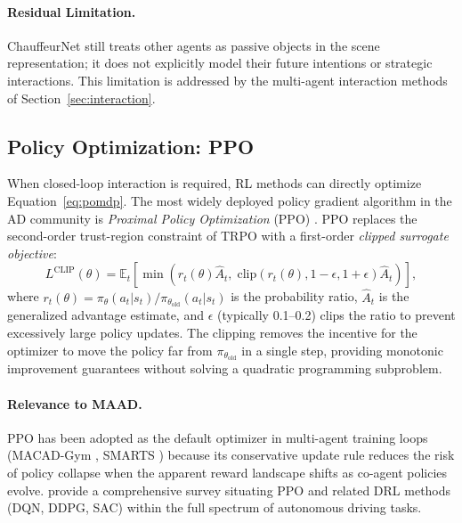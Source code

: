\documentclass[12pt, a4paper]{article}
\begin{document}
\paragraph{Residual Limitation.}
ChauffeurNet still treats other agents as passive objects in the scene
representation; it does not explicitly model their future intentions or strategic
interactions. This limitation is addressed by the multi-agent interaction methods
of Section~\ref{sec:interaction}.

\subsection{Policy Optimization: PPO}
\label{sec:ppo}

When closed-loop interaction is required, RL methods can directly optimize
Equation~\eqref{eq:pomdp}. The most widely deployed policy gradient algorithm in
the AD community is \emph{Proximal Policy Optimization} (PPO)
\citep{schulman2017proximal}. PPO replaces the second-order trust-region
constraint of TRPO with a first-order \emph{clipped surrogate objective}:
\begin{equation}
  L^{\text{CLIP}}(\theta)
  = \mathbb{E}_t \!\left[
      \min\!\left( r_t(\theta)\hat{A}_t,\;
            \text{clip}(r_t(\theta), 1-\epsilon, 1+\epsilon)\hat{A}_t
      \right)
    \right],
  \label{eq:ppo}
\end{equation}
where $r_t(\theta) = \pi_\theta(a_t|s_t)/\pi_{\theta_{\text{old}}}(a_t|s_t)$ is
the probability ratio, $\hat{A}_t$ is the generalized advantage estimate, and
$\epsilon$ (typically 0.1--0.2) clips the ratio to prevent excessively large
policy updates. The clipping removes the incentive for the optimizer to move the
policy far from $\pi_{\theta_{\text{old}}}$ in a single step, providing
monotonic improvement guarantees without solving a quadratic programming subproblem.

\paragraph{Relevance to MAAD.}
PPO has been adopted as the default optimizer in multi-agent training loops
(MACAD-Gym \citep{palanisamy2020multi}, SMARTS \citep{zhou2020smarts}) because
its conservative update rule reduces the risk of policy collapse when the apparent
reward landscape shifts as co-agent policies evolve. \citet{kiran2021deep} provide
a comprehensive survey situating PPO and related DRL methods (DQN, DDPG, SAC)
within the full spectrum of autonomous driving tasks.
\end{document}
